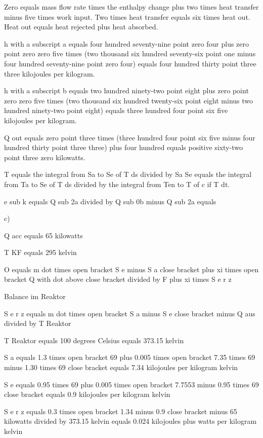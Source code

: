 Zero equals mass flow rate times the enthalpy change plus two times heat transfer minus five times work input. Two times heat transfer equals six times heat out. Heat out equals heat rejected plus heat absorbed.

h with a subscript a equals four hundred seventy-nine point zero four plus zero point zero zero five times (two thousand six hundred seventy-six point one minus four hundred seventy-nine point zero four) equals four hundred thirty point three three kilojoules per kilogram.

h with a subscript b equals two hundred ninety-two point eight plus zero point zero zero five times (two thousand six hundred twenty-six point eight minus two hundred ninety-two point eight) equals three hundred four point six five kilojoules per kilogram.

Q out equals zero point three times (three hundred four point six five minus four hundred thirty point three three) plus four hundred equals positive sixty-two point three zero kilowatts.

T equals the integral from Sa to Se of T ds divided by Sa Se equals the integral from Ta to Se of T ds divided by the integral from Ten to T of c if T dt.

e sub k equals Q sub 2a divided by Q sub 0b minus Q sub 2a equals

c)

Q acc equals 65 kilowatts

T KF equals 295 kelvin

O equals m dot times open bracket S e minus S a close bracket plus xi times open bracket Q with dot above close bracket divided by F plus xi times S e r z

Balance im Reaktor

S e r z equals m dot times open bracket S a minus S e close bracket minus Q aus divided by T Reaktor

T Reaktor equals 100 degrees Celsius equals 373.15 kelvin

S a equals 1.3 times open bracket 69 plus 0.005 times open bracket 7.35 times 69 minus 1.30 times 69 close bracket equals 7.34 kilojoules per kilogram kelvin

S e equals 0.95 times 69 plus 0.005 times open bracket 7.7553 minus 0.95 times 69 close bracket equals 0.9 kilojoules per kilogram kelvin

S e r z equals 0.3 times open bracket 1.34 minus 0.9 close bracket minus 65 kilowatts divided by 373.15 kelvin equals 0.024 kilojoules plus watts per kilogram kelvin

